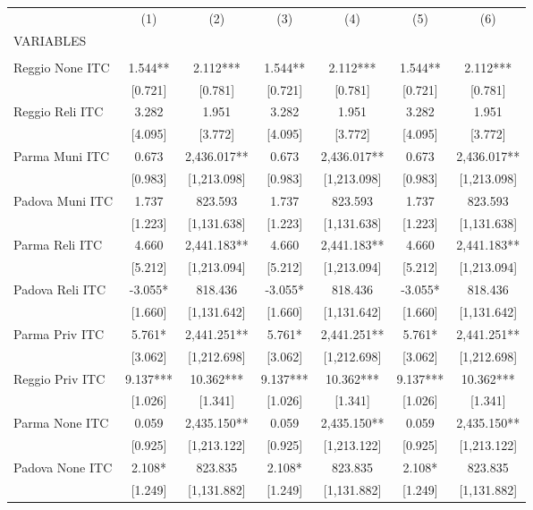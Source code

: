 \begin{tabular}{lcccccc} \hline
 & (1) & (2) & (3) & (4) & (5) & (6) \\
VARIABLES &  &  &  &  &  &  \\ \hline
 &  &  &  &  &  &  \\
Reggio None ITC & 1.544** & 2.112*** & 1.544** & 2.112*** & 1.544** & 2.112*** \\
 & [0.721] & [0.781] & [0.721] & [0.781] & [0.721] & [0.781] \\
Reggio Reli ITC & 3.282 & 1.951 & 3.282 & 1.951 & 3.282 & 1.951 \\
 & [4.095] & [3.772] & [4.095] & [3.772] & [4.095] & [3.772] \\
Parma Muni ITC & 0.673 & 2,436.017** & 0.673 & 2,436.017** & 0.673 & 2,436.017** \\
 & [0.983] & [1,213.098] & [0.983] & [1,213.098] & [0.983] & [1,213.098] \\
Padova Muni ITC & 1.737 & 823.593 & 1.737 & 823.593 & 1.737 & 823.593 \\
 & [1.223] & [1,131.638] & [1.223] & [1,131.638] & [1.223] & [1,131.638] \\
Parma Reli ITC & 4.660 & 2,441.183** & 4.660 & 2,441.183** & 4.660 & 2,441.183** \\
 & [5.212] & [1,213.094] & [5.212] & [1,213.094] & [5.212] & [1,213.094] \\
Padova Reli ITC & -3.055* & 818.436 & -3.055* & 818.436 & -3.055* & 818.436 \\
 & [1.660] & [1,131.642] & [1.660] & [1,131.642] & [1.660] & [1,131.642] \\
Parma Priv ITC & 5.761* & 2,441.251** & 5.761* & 2,441.251** & 5.761* & 2,441.251** \\
 & [3.062] & [1,212.698] & [3.062] & [1,212.698] & [3.062] & [1,212.698] \\
Reggio Priv ITC & 9.137*** & 10.362*** & 9.137*** & 10.362*** & 9.137*** & 10.362*** \\
 & [1.026] & [1.341] & [1.026] & [1.341] & [1.026] & [1.341] \\
Parma None ITC & 0.059 & 2,435.150** & 0.059 & 2,435.150** & 0.059 & 2,435.150** \\
 & [0.925] & [1,213.122] & [0.925] & [1,213.122] & [0.925] & [1,213.122] \\
Padova None ITC & 2.108* & 823.835 & 2.108* & 823.835 & 2.108* & 823.835 \\
 & [1.249] & [1,131.882] & [1.249] & [1,131.882] & [1.249] & [1,131.882] \\

\end{tabular}
